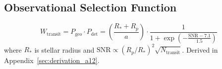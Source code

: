 \subsection{Observational Selection Function}
\begin{equation}
W_{\mathrm{transit}} = P_{\mathrm{geo}} \cdot P_{\mathrm{det}} = \left(\frac{R_* + R_p}{a}\right) \cdot \frac{1}{1 + \exp\left(-\frac{\mathrm{SNR} - 7.1}{1.5}\right)}
\end{equation}
where $R_*$ is stellar radius and $\mathrm{SNR} \propto (R_p / R_*)^2 \sqrt{N_{\text{transit}}}$. Derived in Appendix~\ref{sec:derivation_a12}.
